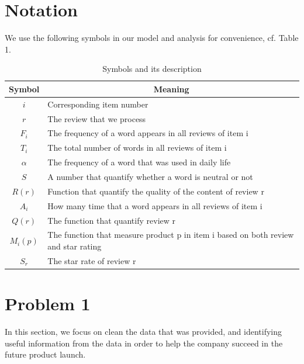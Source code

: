 \documentclass[12pt]{mcmthesis}
\begin{document}
\section{Notation}
We use the following symbols in our model and analysis for convenience, cf. Table 1.
\begin{table}[H]
	\centering
	\setlength{\tabcolsep}{8mm}
	\caption{Symbols and its description}
	\begin{tabular}{cl}
				\hline
				{\bf Symbol} &   \multicolumn{1}{c}{\bf Meaning} \\
				\hline
				{\bf $i$ } & Corresponding item number\\ 
				
				{\bf $r$} & The review that we process\\
				
				{\bf $F_{i}$ } & The frequency of a word appears in all reviews of item i\\
				
				{\bf $T_{i}$ } & The total number of words in all reviews of item i \\
				
				{\bf $\alpha$} &  The frequency of a word that was used in daily life \\
				
				{\bf $S$} &  A number that quantify whether a word is neutral or not\\
				
				{\bf $R(r)$ } & Function that quantify the quality of the content of review r \\
				
				{\bf $A_{i}$ } & How many time that a word appears in all reviews of item i \\
				
				{\bf $Q(r)$} & The function that quantify review r \\
				
				{\bf $M_{i}(p)$} &  The function that measure product p in item i based on both review and star rating \\
				
				{\bf $S_{r}$ } & The star rate of review r \\
				
				\hline
	\end{tabular}
\end{table}

\section{Problem 1}
In this section, we focus on clean the data that was provided, and identifying useful information from the data in order to help the company succeed in the future product launch.
\end{document}
